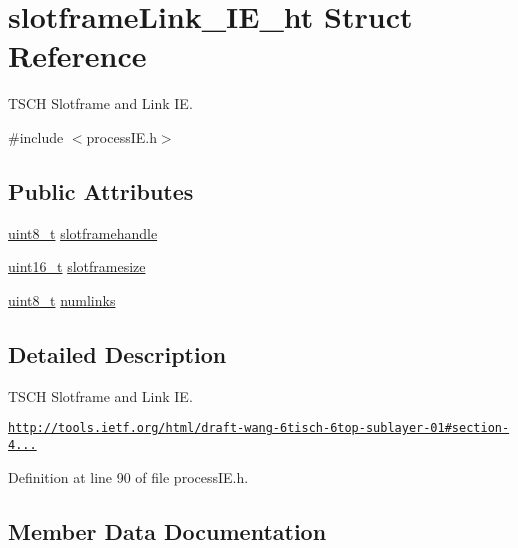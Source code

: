 \hypertarget{structslotframe_link___i_e__ht}{}\section{slotframe\+Link\+\_\+\+I\+E\+\_\+ht Struct Reference}
\label{structslotframe_link___i_e__ht}


T\+S\+CH Slotframe and Link IE.  




{\ttfamily \#include $<$process\+I\+E.\+h$>$}

\subsection*{Public Attributes}
\begin{DoxyCompactItemize}
\item 
\hyperlink{_p_e___types_8h_aba7bc1797add20fe3efdf37ced1182c5}{uint8\+\_\+t} \hyperlink{structslotframe_link___i_e__ht_a860a1e5709a032a55a704942c5de4c7c}{slotframehandle}
\item 
\hyperlink{_p_e___types_8h_a1f1825b69244eb3ad2c7165ddc99c956}{uint16\+\_\+t} \hyperlink{structslotframe_link___i_e__ht_aeb904b1e08ac57dbc5251a3a3c08e978}{slotframesize}
\item 
\hyperlink{_p_e___types_8h_aba7bc1797add20fe3efdf37ced1182c5}{uint8\+\_\+t} \hyperlink{structslotframe_link___i_e__ht_ac554f296590cfbd80e643d94773f38bf}{numlinks}
\end{DoxyCompactItemize}


\subsection{Detailed Description}
T\+S\+CH Slotframe and Link IE. 

\href{http://tools.ietf.org/html/draft-wang-6tisch-6top-sublayer-01#section-4.1.1.2}{\tt http\+://tools.\+ietf.\+org/html/draft-\/wang-\/6tisch-\/6top-\/sublayer-\/01\#section-\/4...} 

Definition at line 90 of file process\+I\+E.\+h.



\subsection{Member Data Documentation}
